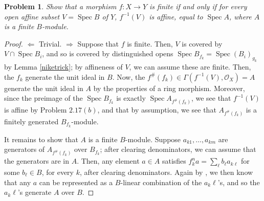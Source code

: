 \documentclass[12pt,letterpaper]{article}
\newtheorem{problem}{Problem}[section]
\theoremstyle{definition}
\theoremstyle{remark}
\numberwithin{equation}{section}
\numberwithin{figure}{problem}
\DeclareMathOperator{\Spec}{Spec}
\newcommand{\OO}{\mathcal{O}}
\begin{document}
\begin{problem}
  Show that a morphism $f\colon X \to Y$ is finite if and only if for \emph{every} open affine subset $V = \Spec B$ of $Y$, $f^{-1}(V)$ is affine, equal to $\Spec A$, where $A$ is a finite $B$-module.
\end{problem}
\begin{proof}
  $\Leftarrow$ Trivial. $\Rightarrow$ Suppose that $f$ is finite. Then, $V$ is covered by $V \cap \Spec B_i$, and so is covered by distinguished opens $\Spec B_{f_k} = \Spec (B_i)_{g_k}$ by Lemma \ref{niketrick}; by affineness of $V$, we can assume these are finite. Then, the $f_k$ generate the unit ideal in $B$. Now, the $f^\#(f_k) \in \Gamma(f^{-1}(V),\OO_X) = A$ generate the unit ideal in $A$ by the properties of a ring morphism. Moreover, since the preimage of the $\Spec B_{f_k}$ is exactly $\Spec A_{f^\#(f_k)}$, we see that $f^{-1}(V)$ is affine by Problem $2.17(b)$, and that by assumption, we see that $A_{f^\#(f_k)}$ is a finitely generated $B_{f_k}$-module.
  \par It remains to show that $A$ is a finite $B$-module. Suppose $a_{k1},\ldots,a_{km}$ are generators of $A_{f^\#(f_k)}$ over $B_{f_k}$; after clearing denominators, we can assume that the generators are in $A$. Then, any element $a \in A$ satisfies $f_k^na = \sum_\ell b_\ell a_{k\ell}$ for some $b_\ell \in B$, for every $k$, after clearing denominators. Again by \cite[Ex.~1.13iv]{AM69}, we then know that any $a$ can be represented as a $B$-linear combination of the $a_k\ell$'s, and so the $a_k\ell$'s generate $A$ over $B$.
\end{proof}
\end{document}
